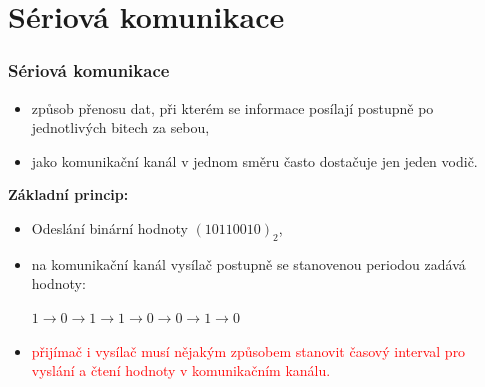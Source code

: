 \section{\texorpdfstring{Sériová komunikace}{Seriova komunikace}}

	\begin{frame}
    \frametitle{Sériová komunikace}
    
    \begin{itemize}
      \item způsob přenosu dat, při kterém se informace posílají postupně po jednotlivých bitech za sebou,
      \item jako komunikační kanál v jednom směru často dostačuje jen jeden vodič.
    \end{itemize}
    
    \vspace{5mm}
    \textbf{Základní princip:}
    
    \begin{itemize}
      \item Odeslání binární hodnoty $(10110010)_2$,
      \item na komunikační kanál vysílač postupně se stanovenou periodou zadává hodnoty:
      \begin{center}
        $1 \longrightarrow 0 \longrightarrow 1 \longrightarrow 1 \longrightarrow 0 \longrightarrow 0 \longrightarrow 1 \longrightarrow 0$
      \end{center}
      \item \textcolor{red}{přijímač i vysílač musí nějakým způsobem stanovit časový interval pro vyslání a čtení hodnoty v komunikačním kanálu.}
    \end{itemize}

	\end{frame}
  
